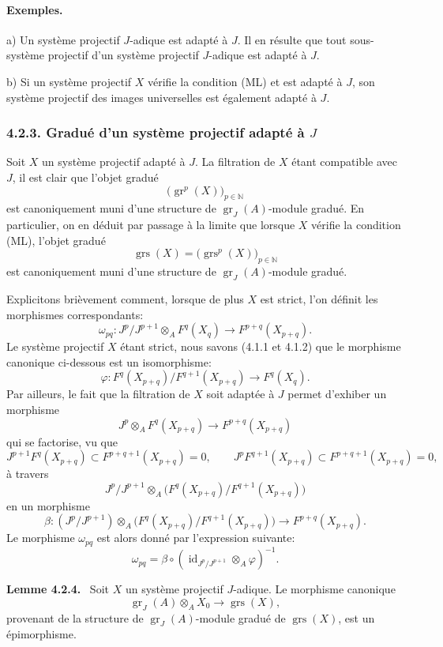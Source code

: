\documentclass[11pt]{article}
\newenvironment{statement}[1]{\par\medskip\noindent\textbf{#1.}\ }{\par\medskip}
\providecommand{\gr}{\operatorname{gr}}
\providecommand{\id}{\operatorname{id}}
\providecommand{\id}{\operatorname{id}}
\providecommand{\gr}{\operatorname{gr}}
\providecommand{\gr}{\operatorname{gr}}
\providecommand{\grs}{\operatorname{grs}}
\providecommand{\id}{\operatorname{id}}
\providecommand{\id}{\operatorname{id}}
\providecommand{\id}{\operatorname{id}}
\providecommand{\id}{\operatorname{id}}
\begin{document}
\paragraph{Exemples.}
a) Un système projectif \(J\)-adique est adapté à \(J\). Il en résulte que tout sous-système projectif d'un système projectif \(J\)-adique est adapté à \(J\).

b) Si un système projectif \(X\) vérifie la condition (ML) et est adapté à \(J\), son système projectif des images universelles est également adapté à \(J\).

\subsubsection*{4.2.3. Gradué d'un système projectif adapté à \(J\)}
Soit \(X\) un système projectif adapté à \(J\). La filtration de \(X\) étant compatible avec \(J\), il est clair que l'objet gradué
\[
\bigl(\gr^p(X)\bigr)_{p\in\mathbb N}
\]
est canoniquement muni d'une structure de \(\gr_J(A)\)-module gradué. En particulier, on en déduit par passage à la limite que lorsque \(X\) vérifie la condition (ML), l'objet gradué
\[
\grs(X)=\bigl(\grs^p(X)\bigr)_{p\in\mathbb N}
\]
est canoniquement muni d'une structure de \(\gr_J(A)\)-module gradué.

Explicitons brièvement comment, lorsque de plus \(X\) est strict, l'on définit les morphismes correspondants:
\[
\omega_{pq}: J^p/J^{p+1}\otimes_A F^q(X_q)\longrightarrow F^{p+q}(X_{p+q}).
\]
Le système projectif \(X\) étant strict, nous savons (4.1.1 et 4.1.2) que le morphisme canonique ci-dessous est un isomorphisme:
\[
\varphi:F^q(X_{p+q})/F^{q+1}(X_{p+q})\longrightarrow F^q(X_q).
\]
Par ailleurs, le fait que la filtration de \(X\) soit adaptée à \(J\) permet d'exhiber un morphisme
\[
J^p\otimes_A F^q(X_{p+q})\longrightarrow F^{p+q}(X_{p+q})
\]
qui se factorise, vu que
\[
J^{p+1}F^q(X_{p+q})\subset F^{p+q+1}(X_{p+q})=0,\qquad
J^pF^{q+1}(X_{p+q})\subset F^{p+q+1}(X_{p+q})=0,
\]
à travers
\[
J^p/J^{p+1}\otimes_A
\bigl(F^q(X_{p+q})/F^{q+1}(X_{p+q})\bigr)
\]
en un morphisme
\[
\beta:(J^p/J^{p+1})\otimes_A
\bigl(F^q(X_{p+q})/F^{q+1}(X_{p+q})\bigr)
\longrightarrow F^{p+q}(X_{p+q}).
\]
Le morphisme \(\omega_{pq}\) est alors donné par l'expression suivante:
\[
\omega_{pq}=\beta\circ(\id_{J^p/J^{p+1}}\otimes_A\varphi)^{-1}.
\]

\begin{statement}{Lemme 4.2.4}
Soit \(X\) un système projectif \(J\)-adique. Le morphisme canonique
\[
\gr_J(A)\otimes_A X_0\longrightarrow \grs(X),
\]
provenant de la structure de \(\gr_J(A)\)-module gradué de \(\grs(X)\), est un épimorphisme.
\end{statement}
\end{document}
